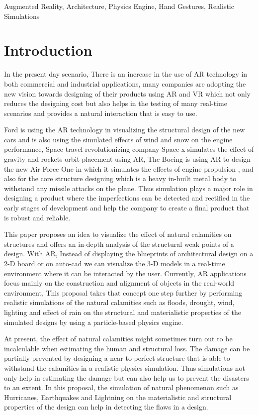 \documentclass[conference]{IEEEtran}
\begin{document}
\begin{IEEEkeywords}
	Augmented Reality, Architecture, Physics Engine, Hand Gestures, Realistic Simulations
\end{IEEEkeywords}

\section{Introduction}
In the present day scenario, There is an increase in the use of AR technology in both commercial and industrial applications, many companies are adopting the new vision towards designing of their products using AR and VR which not only reduces the designing cost but also helps in the testing of many real-time scenarios and provides a natural interaction that is easy to use.

Ford is using the AR technology in visualizing the structural design of the new cars and is also using the simulated effects of wind and snow on 
the engine performance, Space travel revolutionizing company Space-x simulates the effect of gravity and rockets orbit placement using AR, 
The Boeing is using AR to design the new Air Force One in which it simulates the effects of engine propulsion , and also for the core structure designing which is a heavy in-built metal body to withstand any missile attacks on the plane. Thus simulation plays a major role in designing a product where the imperfections can be detected and rectified in the early stages of development and help the company to create a final product that is robust and reliable.

This paper proposes an idea to visualize the effect of natural calamities on structures and offers an in-depth analysis of the structural weak points of a design. With AR, Instead of displaying the blueprints of architectural design on a 2-D board or on auto-cad we can visualize the 3-D models in a real-time environment where it can be interacted by the user. Currently, AR applications focus mainly on the construction and alignment of objects in the real-world environment, This proposal takes that concept one step further by performing realistic simulations of the natural calamities such as floods,  drought, wind, lighting and effect of rain on the structural and materialistic properties of the simulated designs by using a particle-based physics engine. 

At present, the effect of natural calamities might sometimes turn out to be incalculable when estimating the human and structural loss. The damage can be partially prevented by designing a near to perfect structure that is able to withstand the calamities in a realistic physics simulation. Thus simulations not only help in estimating the damage but can also help us to prevent the disasters to an extent. In this proposal, the simulation of natural phenomenon such as Hurricanes, Earthquakes and Lightning on the materialistic and structural properties of the design can help in detecting the flaws in a design.
\end{document}
